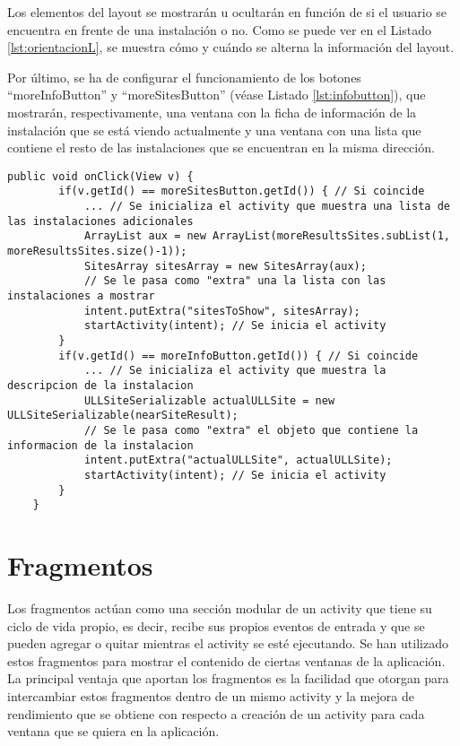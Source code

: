 

Los elementos del layout se mostrarán u ocultarán en función de si el usuario se  encuentra en frente de una instalación o no. Como se puede ver en el Listado \ref{lst:orientacionL}, se muestra cómo y cuándo se alterna la información del layout.

Por último, se ha de configurar el funcionamiento de los botones ``moreInfoButton'' y ``moreSitesButton'' (véase Listado \ref{lst:infobutton}), que mostrarán, respectivamente, una ventana con la ficha de información de la instalación que se está viendo actualmente y una ventana con una lista que contiene el resto de las instalaciones que se encuentran en la misma dirección. 

\begin{lstlisting}[caption={Fichero \texttt{ARNavigation.java}, código para manejar los eventos de los botones.},  label={lst:infobutton}]
    public void onClick(View v) {
        if(v.getId() == moreSitesButton.getId()) { // Si coincide
            ... // Se inicializa el activity que muestra una lista de las instalaciones adicionales
            ArrayList aux = new ArrayList(moreResultsSites.subList(1, moreResultsSites.size()-1));
            SitesArray sitesArray = new SitesArray(aux);
            // Se le pasa como "extra" una la lista con las instalaciones a mostrar
            intent.putExtra("sitesToShow", sitesArray);
            startActivity(intent); // Se inicia el activity
        }
        if(v.getId() == moreInfoButton.getId()) { // Si coincide
            ... // Se inicializa el activity que muestra la descripcion de la instalacion
            ULLSiteSerializable actualULLSite = new ULLSiteSerializable(nearSiteResult);
            // Se le pasa como "extra" el objeto que contiene la informacion de la instalacion
            intent.putExtra("actualULLSite", actualULLSite);
            startActivity(intent); // Se inicia el activity
        }
    }
\end{lstlisting}

\section{Fragmentos}

Los fragmentos \cite{URL::fragment} actúan como una sección modular de un activity que tiene su ciclo de vida propio, es decir, recibe sus propios eventos de entrada y que se pueden agregar o quitar mientras el activity se esté ejecutando. Se han utilizado estos fragmentos para mostrar el contenido de ciertas ventanas de la aplicación. La principal ventaja que  aportan los fragmentos es la facilidad que otorgan para intercambiar estos fragmentos dentro de un mismo activity y la mejora de rendimiento que se obtiene con respecto a creación de un activity para cada ventana que se quiera en la aplicación.

